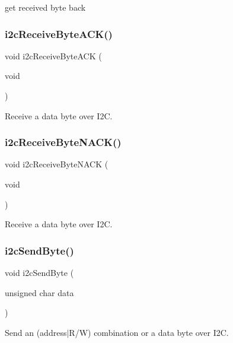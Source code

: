 get received byte back 

\mbox{\label{twi__lib_8h_a4184f1fc2b762cc5f8032ee9df97e92c}} 
\subsubsection{i2c\+Receive\+Byte\+A\+C\+K()}
{\footnotesize\ttfamily void i2c\+Receive\+Byte\+A\+CK (\begin{DoxyParamCaption}\item[{void}]{ }\end{DoxyParamCaption})}



Receive a data byte over I2C. 

\mbox{\label{twi__lib_8h_afaacac2e6df78d08983de116deaab23a}} 
\subsubsection{i2c\+Receive\+Byte\+N\+A\+C\+K()}
{\footnotesize\ttfamily void i2c\+Receive\+Byte\+N\+A\+CK (\begin{DoxyParamCaption}\item[{void}]{ }\end{DoxyParamCaption})}



Receive a data byte over I2C. 

\mbox{\label{twi__lib_8h_a9496352bbfeb53c358f4dfd053497f33}} 
\subsubsection{i2c\+Send\+Byte()}
{\footnotesize\ttfamily void i2c\+Send\+Byte (\begin{DoxyParamCaption}\item[{unsigned char}]{data }\end{DoxyParamCaption})}



Send an (address$\vert$\+R/W) combination or a data byte over I2C. 

